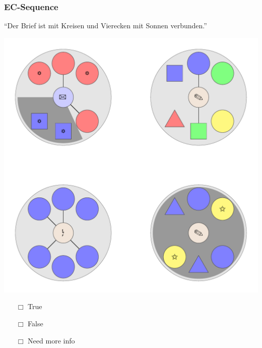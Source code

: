 \documentclass[fleqn,10pt,xcolor=dvipsnames]{beamer}
\newcommand{\EC}{EC\xspace}
\newcommand{\mymark}[1]{{\color{mycol}{#1}}}
\begin{document}
\begin{frame}
  \frametitle{\EC-Sequence}
  \begin{center}
    ``Der Brief ist mit Kreisen und Vierecken mit Sonnen verbunden.''

    \vspace{0.1cm}

    \includegraphics[width=0.5 \textwidth]{../../pictures/ec_01_4.pdf}

    \vspace{0.1cm}

    \begin{multicols}{3}
      \begin{itemize} 
      \item[$\Box$] True\\
        \onslide<2>{$\leadsto$  \mymark{false}}
      \item[$\Box$] False\\
        \onslide<2>{$\leadsto$ \mymark{false}}
      \item[$\Box$] Need more info 
      \end{itemize}
    \end{multicols}

  \end{center}
\end{frame}
\end{document}
